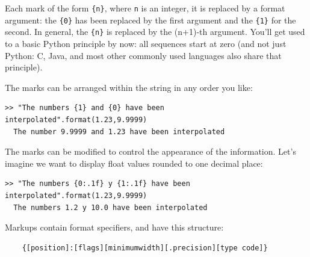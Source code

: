 Each mark of the form \verb|{n}|, where \verb|n| is an integer, it is replaced by a format argument: the \verb|{0}| has been replaced by the first argument and the \verb|{1}| for the second. In general, the \verb|{n}| is replaced by the (n+1)-th argument. You'll get used to a basic Python principle by now: all sequences start at zero (and not just Python: C, Java, and most other commonly used languages also share that principle).

The marks can be arranged within the string in any order you like:

\begin{Verbatim}[frame=single]
>> "The numbers {1} and {0} have been interpolated".format(1.23,9.9999)
  The number 9.9999 and 1.23 have been interpolated
\end{Verbatim}

The marks can be modified to control the appearance of the information. Let's imagine we want to display float values rounded to one decimal place:

\begin{Verbatim}[frame=single]
>> "The numbers {0:.1f} y {1:.1f} have been interpolated".format(1.23,9.9999)
  The numbers 1.2 y 10.0 have been interpolated
\end{Verbatim}


Markups contain format specifiers, and have this structure:

\begin{verbatim}
    {[position]:[flags][minimumwidth][.precision][type code]}
\end{verbatim}

